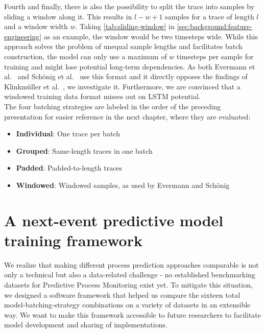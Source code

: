 Fourth and finally, there is also the possibility to split the trace into samples by sliding a window along it. This results in $l-w+1$ samples for a trace of length $l$ and a window width $w$. Taking \autoref{tab:sliding-window} in \autoref{sec:background:feature-engineering} as an example, the window would be two timesteps wide. While this approach solves the problem of unequal sample lengths and facilitates batch construction, the model can only use a maximum of $w$ timesteps per sample for training and might lose potential long-term dependencies. As both Evermann et al.~\cite{evermann2016} and Schönig et al.~\cite{schoenig2018} use this format and it directly opposes the findings of Klinkmüller et al.~\cite{klinkmuller2018reliablemonitoring}, we investigate it. Furthermore, we are convinced that a windowed training data format misses out on LSTM potential.\\

The four batching strategies are labeled in the order of the preceding presentation for easier reference in the next chapter, where they are evaluated:
\begin{itemize}
\item\textbf{Individual}: One trace per batch
\item\textbf{Grouped}: Same-length traces in one batch
\item\textbf{Padded}: Padded-to-length traces
\item\textbf{Windowed}: Windowed samples, as used by Evermann and Schönig
\end{itemize}

\section{A next-event predictive model training framework}
\label{sec:contrib:training-framework}
We realize that making different process prediction approaches comparable is not only a technical but also a data-related challenge - no established benchmarking datasets for Predictive Process Monitoring exist yet.
To mitigate this situation, we designed a software framework that helped us compare the sixteen total model-batching-strategy combinations on a variety of datasets in an extensible way. We want to make this framework accessible to future researchers to facilitate model development and sharing of implementations.\\

